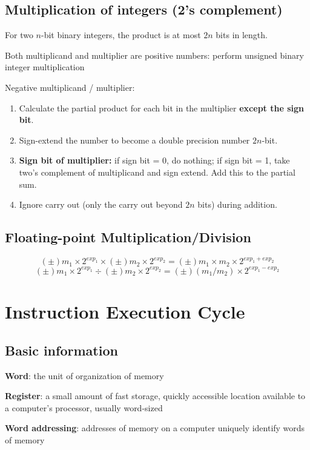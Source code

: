 \documentclass[11pt,a4paper]{article}
\begin{document}
\subsection{Multiplication of integers (2's complement)}
For two $n$-bit binary integers, the product is at most $2n$ bits in length. \par
Both multiplicand and multiplier are positive numbers: perform unsigned binary integer multiplication \par
Negative multiplicand / multiplier:
\begin{enumerate}
    \item [\textbf{Step 1. }] Calculate the partial product for each bit in the multiplier \textbf{except the sign bit}.
    
    \item [\textbf{Step 2. }] Sign-extend the number to become a double precision number $2n$-bit.

    \item [\textbf{Step 3. }] \textbf{Sign bit of multiplier:} if sign bit = 0, do nothing; if sign bit = 1, take two's complement of multiplicand and sign extend. Add this to the partial sum.

    \item [\textbf{Step 4. }] Ignore carry out (only the carry out beyond $2n$ bits) during addition.

\end{enumerate}

\subsection{Floating-point Multiplication/Division}
\[
(\pm) m_1 \times 2^{exp_1} \times (\pm) m_2 \times 2^{exp_2} = (\pm) m_1 \times m_2 \times 2^{exp_1 + exp_2}
\]
\[
(\pm) m_1 \times 2^{exp_1} \div (\pm) m_2 \times 2^{exp_2} = (\pm) (m_1 / m_2) \times 2^{exp_1 - exp_2}
\]

\section{Instruction Execution Cycle}
\subsection{Basic information}
\textbf{Word}: the unit of organization of memory \par
\textbf{Register}: a small amount of fast storage, quickly accessible location available to a computer's processor, usually word-sized \par
\textbf{Word addressing}: addresses of memory on a computer uniquely identify words of memory\par
\end{document}
